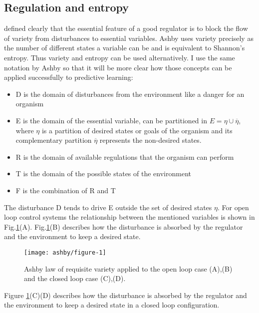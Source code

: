 \subsection{Regulation and entropy}
\label{Appendix:Ashby}
\citet{Ashby1956:IntroCybernetics} defined clearly that the
 essential feature of a good regulator is to block the flow of variety from
disturbances to essential variables. Ashby uses variety precisely as the number
 of different states a variable can be and is equivalent to Shannon's entropy.
Thus variety and entropy can be used alternatively.
I use the same notation by Ashby so that it will be more clear how those concepts
can be applied successfully to predictive learning:
\begin{itemize}
 \item D is the domain of disturbances from the environment like a danger for an organism
 \item E is the domain of the essential variable, can be partitioned in
$E= \eta \cup \overline{\eta}$, where $\eta$ is a partition of desired states
 or goals of the organism and its complementary partition $\overline{\eta}$
 represents the non-desired states.
 \item R is the domain of available regulations that the organism can perform
 \item T is the domain of the possible states of the environment
 \item F is the combination of R and T
\end{itemize}
The disturbance D tends to drive E outside the set of desired states $\eta$.
For open loop control systems the relationship between the mentioned variables 
is shown in Fig.\ref{fig:infotheory:ashby-model}(A).
Fig.\ref{fig:infotheory:ashby-model}(B) describes how the disturbance is absorbed by the regulator
 and the environment to keep a desired state.
\begin{figure}[!htbp]
\begin{center}
 \texttt{[image: ashby/figure-1]}
\caption[Ashby requisite variety]{Ashby law of requisite variety applied 
to the open loop case (A),(B) and the closed loop case (C),(D).
\label{fig:infotheory:ashby-model}
}
\end{center}
\end{figure}

Figure \ref{fig:infotheory:ashby-model}(C)(D) describes how the disturbance is absorbed by the regulator
 and the environment to keep a desired state in a closed loop configuration.

